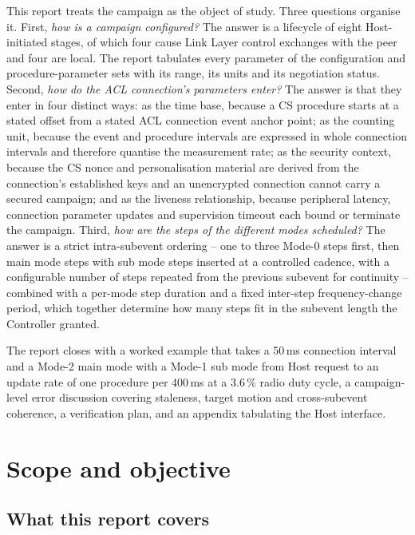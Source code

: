 \documentclass[11pt,a4paper]{article}
\begin{document}
This report treats the campaign as the object of study. Three questions organise it. First,
\emph{how is a campaign configured?} The answer is a lifecycle of eight Host-initiated stages, of
which four cause Link Layer control exchanges with the peer and four are local. The report tabulates
every parameter of the configuration and procedure-parameter sets with its range, its units and its
negotiation status. Second, \emph{how do the ACL connection's parameters enter?} The answer is that
they enter in four distinct ways: as the time base, because a CS procedure starts at a stated offset
from a stated ACL connection event anchor point; as the counting unit, because the event and
procedure intervals are expressed in whole connection intervals and therefore quantise the
measurement rate; as the security context, because the CS nonce and personalisation material are
derived from the connection's established keys and an unencrypted connection cannot carry a secured
campaign; and as the liveness relationship, because peripheral latency, connection parameter updates
and supervision timeout each bound or terminate the campaign. Third, \emph{how are the steps of the
different modes scheduled?} The answer is a strict intra-subevent ordering -- one to three Mode-0
steps first, then main mode steps with sub mode steps inserted at a controlled cadence, with a
configurable number of steps repeated from the previous subevent for continuity -- combined with a
per-mode step duration and a fixed inter-step frequency-change period, which together determine how
many steps fit in the subevent length the Controller granted.

The report closes with a worked example that takes a 50\,ms connection interval and a Mode-2 main
mode with a Mode-1 sub mode from Host request to an update rate of one procedure per 400\,ms
at a 3.6\,\% radio duty cycle, a campaign-level error discussion covering staleness, target motion
and cross-subevent coherence, a verification plan, and an appendix tabulating the Host interface.

\newpage
\tableofcontents
\newpage
{}

\section{Scope and objective}
\label{sec:scope}

\subsection{What this report covers}
\end{document}

